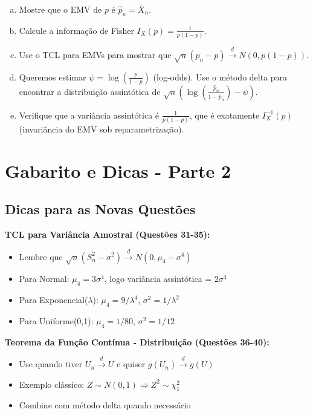 \documentclass[12pt,a4paper]{article}
\begin{document}
\begin{enumerate}[(a)]
    \item Mostre que o EMV de $p$ é $\hat{p}_n = \bar{X}_n$.
    \item Calcule a informação de Fisher $I_X(p) = \frac{1}{p(1-p)}$.
    \item Use o TCL para EMVs para mostrar que $\sqrt{n}(\hat{p}_n - p) \xrightarrow{d} N(0, p(1-p))$.
    \item Queremos estimar $\psi = \log\left(\frac{p}{1-p}\right)$ (log-odds). Use o método delta para encontrar a distribuição assintótica de $\sqrt{n}(\log(\frac{\hat{p}_n}{1-\hat{p}_n}) - \psi)$.
    \item Verifique que a variância assintótica é $\frac{1}{p(1-p)}$, que é exatamente $I_X^{-1}(p)$ (invariância do EMV sob reparametrização).
\end{enumerate}

\section{Gabarito e Dicas - Parte 2}

\subsection{Dicas para as Novas Questões}

\textbf{TCL para Variância Amostral (Questões 31-35):}
\begin{itemize}
    \item Lembre que $\sqrt{n}(S_n^2 - \sigma^2) \xrightarrow{d} N(0, \mu_4 - \sigma^4)$
    \item Para Normal: $\mu_4 = 3\sigma^4$, logo variância assintótica = $2\sigma^4$
    \item Para Exponencial($\lambda$): $\mu_4 = 9/\lambda^4$, $\sigma^2 = 1/\lambda^2$
    \item Para Uniforme(0,1): $\mu_4 = 1/80$, $\sigma^2 = 1/12$
\end{itemize}

\textbf{Teorema da Função Contínua - Distribuição (Questões 36-40):}
\begin{itemize}
    \item Use quando tiver $U_n \xrightarrow{d} U$ e quiser $g(U_n) \xrightarrow{d} g(U)$
    \item Exemplo clássico: $Z \sim N(0,1) \Rightarrow Z^2 \sim \chi^2_1$
    \item Combine com método delta quando necessário
\end{itemize}
\end{document}
